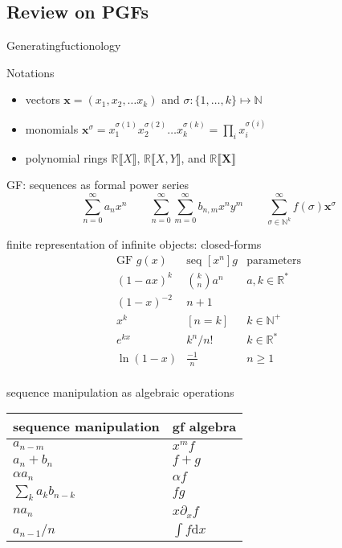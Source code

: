 \documentclass[8pt]{beamer}
\renewcommand{\S}[1]{ \llbracket #1 \rrbracket }
\begin{document}
\subsection{Review on PGFs}
\begin{frame}[allowframebreaks]{Generatingfuctionology\cite{gfbook}}
	\begin{block}{Notations}
		\begin{itemize}
			\item vectors \(\mathbf{x} = (x_1,x_2,\ldots x_k)\) and \(\sigma: \{1,\ldots,k\}\mapsto \mathbb{N}\)
			\item monomials \(\mathbf{x}^\sigma = x_1^{\sigma(1)} x_2^{\sigma(2)} \ldots x_k^{\sigma(k)} = \prod_i x_i^{\sigma(i)}\)
			\item polynomial rings \(\mathbb{R}\S{X}\), \(\mathbb{R}\S{X,Y}\), and \(\mathbb{R}\S{\mathbf{X}}\)
		\end{itemize}
	\end{block}
	\begin{block}{GF: sequences as formal power series}
		\[
			\sum_{n=0}^\infty a_n x^n
			\qquad
			\sum_{n=0}^\infty\sum_{m=0}^\infty b_{n,m} x^n y^m
			\qquad
			\sum_{\sigma \in\mathbb{N}^k}^\infty f(\sigma) \mathbf{x}^\sigma
		\]
	\end{block}
	\begin{block}{finite representation of infinite objects: closed-forms}
		\[
			\begin{array}{l|l|l}
				\hline
				\text{GF }g(x) & \text{seq }[x^n]g & \text{parameters}       \\
				\hline
				(1-ax)^k       & \binom{k}{n}a^n   & a,k\in\mathbb{R}^{\ast} \\
				(1-x)^{-2}     & n+1               &                         \\
				x^k            & [n=k]             & k\in\mathbb{N}^{+}      \\
				e^{kx}         & k^n/n!            & k\in\mathbb{R}^{\ast}   \\
				\ln(1-x)       & \frac{-1}{n}      & n\geq 1                 \\
			\end{array}
		\]
	\end{block}
	\begin{block}{sequence manipulation as algebraic operations}
		\centering
		\begin{tabular}{l|l}
			\hline
			sequence manipulation   & gf algebra             \\
			\hline
			\(a_{n-m}\)             & \(x^m f\)              \\
			\(a_{n} + b_{n}\)       & \(f+g\)                \\
			\(\alpha a_{n}\)        & \(\alpha f\)           \\
			\(\sum_k a_{k}b_{n-k}\) & \(fg\)                 \\
			\(n a_n\)               & \(x \partial_x f\)     \\
			\(a_{n-1}/n\)           & \(\int f \mathrm{d}x\) \\
		\end{tabular}
	\end{block}


\end{frame}
\end{document}
